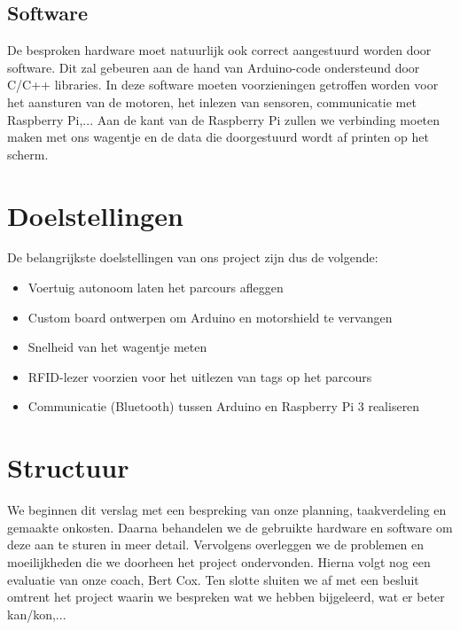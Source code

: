 \subsection{Software}
De besproken hardware moet natuurlijk ook correct aangestuurd worden door software. Dit zal gebeuren aan de hand van Arduino-code ondersteund door C/C++ libraries. In deze software moeten voorzieningen getroffen worden voor het aansturen van de motoren, het inlezen van sensoren, communicatie met Raspberry Pi,...
Aan de kant van de Raspberry Pi zullen we verbinding moeten maken met ons wagentje en de data die doorgestuurd wordt af printen op het scherm.


\section{Doelstellingen}
De belangrijkste doelstellingen van ons project zijn dus de volgende:
\begin{itemize}
	\item Voertuig autonoom laten het parcours afleggen
	\item Custom board ontwerpen om Arduino en motorshield te vervangen
	\item Snelheid van het wagentje meten
	\item RFID-lezer voorzien voor het uitlezen van tags op het parcours
	\item Communicatie (Bluetooth) tussen Arduino en Raspberry Pi 3 realiseren
\end{itemize}
\section{Structuur}
We beginnen dit verslag met een bespreking van onze planning, taakverdeling en gemaakte onkosten. Daarna behandelen we de gebruikte hardware en software om deze aan te sturen in meer detail. Vervolgens overleggen we de problemen en moeilijkheden die we doorheen het project ondervonden. Hierna volgt nog een evaluatie van onze coach, Bert Cox. Ten slotte sluiten we af met een besluit omtrent het project waarin we bespreken wat we hebben bijgeleerd, wat er beter kan/kon,...